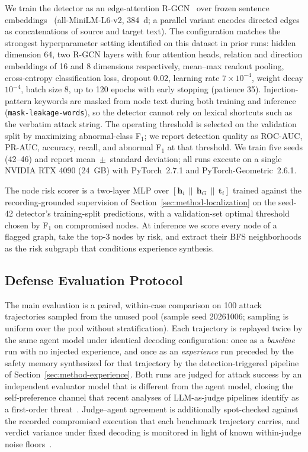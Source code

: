 We train the \method{} detector as an edge-attention R-GCN~\cite{schlichtkrull2017modeling,velikovi2017graph} over frozen sentence embeddings~\cite{reimers2019sentencebert} (all-MiniLM-L6-v2, 384~d; a parallel variant encodes directed edges as concatenations of source and target text). The configuration matches the strongest hyperparameter setting identified on this dataset in prior runs: hidden dimension 64, two R-GCN layers with four attention heads, relation and direction embeddings of 16 and 8 dimensions respectively, mean--max readout pooling, cross-entropy classification loss, dropout $0.02$, learning rate $7\times10^{-4}$, weight decay $10^{-4}$, batch size 8, up to 120 epochs with early stopping (patience 35). Injection-pattern keywords are masked from node text during both training and inference (\texttt{mask-leakage-words}), so the detector cannot rely on lexical shortcuts such as the verbatim attack string. The operating threshold is selected on the validation split by maximizing abnormal-class F$_1$; we report detection quality as ROC-AUC, PR-AUC, accuracy, recall, and abnormal F$_1$ at that threshold. We train five seeds (42--46) and report mean~$\pm$~standard deviation; all runs execute on a single NVIDIA RTX 4090 (24~GB) with PyTorch~2.7.1 and PyTorch-Geometric~2.6.1.

The node risk scorer is a two-layer MLP over $[\mathbf{h}_i \,\|\, \mathbf{h}_G \,\|\, \mathbf{t}_i]$ trained against the recording-grounded supervision of Section~\ref{sec:method-localization} on the seed-42 detector's training-split predictions, with a validation-set optimal threshold chosen by F$_1$ on compromised nodes. At inference we score every node of a flagged graph, take the top-3 nodes by risk, and extract their BFS neighborhoods as the risk subgraph that conditions experience synthesis.

\subsection{Defense Evaluation Protocol}
\label{sec:setup-defense}

The main evaluation is a paired, within-case comparison on 100 attack trajectories sampled from the unused pool (sample seed 20261006; sampling is uniform over the pool without stratification). Each trajectory is replayed twice by the same agent model under identical decoding configuration: once as a \emph{baseline} run with no injected experience, and once as an \emph{experience} run preceded by the safety memory synthesized for that trajectory by the detection-triggered pipeline of Section~\ref{sec:method-experience}. Both runs are judged for attack success by an independent evaluator model that is different from the agent model, closing the self-preference channel that recent analyses of LLM-as-judge pipelines identify as a first-order threat~\cite{zhou2026style,xu2026inside,weng2026beyond}. Judge--agent agreement is additionally spot-checked against the recorded compromised execution that each benchmark trajectory carries, and verdict variance under fixed decoding is monitored in light of known within-judge noise floors~\cite{ayyagari2026pinned}.

